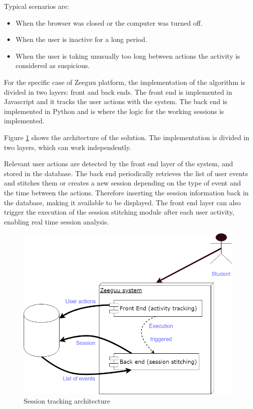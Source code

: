 Typical scenarios are:

\begin{itemize}
	\item When the browser was closed or the computer was turned off.
	
	\item When the user is inactive for a long period.
	
	\item When the user is taking unusually too long between actions the activity is considered as suspicious.
\end{itemize}

For the specific case of Zeeguu platform, the implementation of the algorithm is divided in two layers: front and back ends. The front end is implemented in Javascript and it tracks the user actions with the system. The back end is implemented in Python and is where the logic for the working sessions is implemented.

Figure \ref{fig:session_tracking_architecture} shows the architecture of the solution. The implementation is divided in two layers, which can work independently. 

Relevant user actions are detected by the front end layer of the system, and stored in the database. The back end periodically retrieves the list of user events and stitches them or creates a new session depending on the type of event and the time between the actions. Therefore inserting the session information back in the database, making it available to be displayed.
The front end layer can also trigger the execution of the session stitching module after each user activity, enabling real time session analysis.

\begin{figure}[bth]
	\centering
	\includegraphics[width=0.7\linewidth]{gfx/session_tracking_architecture}
	\caption{Session tracking architecture}\label{fig:session_tracking_architecture}
\end{figure}

